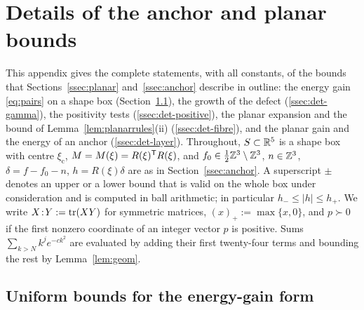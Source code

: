 \section{Details of the anchor and planar bounds}\label{app:details}

This appendix gives the complete statements, with all constants, of the bounds that Sections~\ref{ssec:planar}
and~\ref{ssec:anchor} describe in outline: the energy gain \eqref{eq:pairs} on a shape box (Section~\ref{ssec:det-gain}), the growth
of the defect (\ref{ssec:det-gamma}), the positivity tests (\ref{ssec:det-positive}), the planar expansion and the bound of
Lemma~\ref{lem:planarrules}(ii) (\ref{ssec:det-fibre}), and the planar gain and the energy of an anchor (\ref{ssec:det-layer}).
Throughout, $S\subset\mathbb R^5$ is a shape box with centre $\xi_{\mathrm c}$, $M=M(\xi)=R(\xi)^\mathsf T R(\xi)$, and
$f_0\in\frac12\mathbb Z^3\setminus\mathbb Z^3$, $n\in\mathbb Z^3$, $\delta=f-f_0-n$, $h=R(\xi)\delta$ are as in Section~\ref{ssec:anchor}.
A superscript $\pm$ denotes an upper or a lower bound that is valid on the whole box under consideration
and is computed in ball arithmetic; in particular $h_-\le|h|\le h_+$. We write $X\!:\!Y:=\operatorname{tr}(XY)$ for symmetric matrices,
$(x)_+:=\max\{x,0\}$, and $p\succ0$ if the first nonzero coordinate of an integer vector $p$ is positive. Sums
$\sum_{k>N}k^je^{-ck^2}$ are evaluated by adding their first twenty-four terms and bounding the rest by Lemma~\ref{lem:geom}.

\subsection{Uniform bounds for the energy-gain form}\label{ssec:det-gain}

